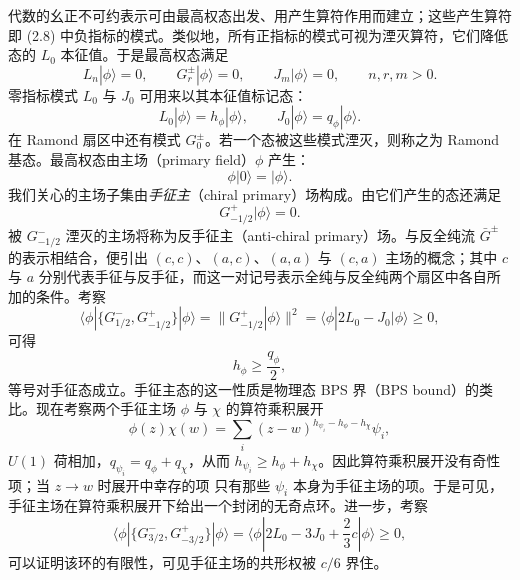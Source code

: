 代数的幺正不可约表示可由最高权态出发、用产生算符作用而建立；这些产生算符即 (2.8) 中负指标的模式。类似地，所有正指标的模式可视为湮灭算符，它们降低态的 $L_{0}$ 本征值。于是最高权态满足
\begin{equation}\tag{2.10}
L_{n}|\phi\rangle=0,\qquad G^{\pm}_{r}|\phi\rangle=0,\qquad J_{m}|\phi\rangle=0,\qquad n,r,m>0.
\end{equation}
零指标模式 $L_{0}$ 与 $J_{0}$ 可用来以其本征值标记态：
\begin{equation}\tag{2.11}
L_{0}|\phi\rangle=h_{\phi}|\phi\rangle,\qquad J_{0}|\phi\rangle=q_{\phi}|\phi\rangle.
\end{equation}
在 Ramond 扇区中还有模式 $G^{\pm}_{0}$。若一个态被这些模式湮灭，则称之为 Ramond 基态。最高权态由主场（primary field）$\phi$ 产生：
\begin{equation}\tag{2.12}
\phi|0\rangle=|\phi\rangle.
\end{equation}
我们关心的主场子集由\emph{手征主}（chiral primary）场构成。由它们产生的态还满足
\begin{equation}\tag{2.13}
G^{+}_{-1/2}|\phi\rangle=0.
\end{equation}
被 $G^{-}_{-1/2}$ 湮灭的主场将称为反手征主（anti-chiral primary）场。与反全纯流 $\bar G^{\pm}$ 的表示相结合，便引出 $(c,c)$、$(a,c)$、$(a,a)$ 与 $(c,a)$ 主场的概念；其中 $c$ 与 $a$ 分别代表手征与反手征，而这一对记号表示全纯与反全纯两个扇区中各自所加的条件。考察
\begin{equation}\tag{2.14}
\langle\phi|\{G^{-}_{1/2},G^{+}_{-1/2}\}|\phi\rangle=\|G^{+}_{-1/2}|\phi\rangle\|^{2}=\langle\phi|2L_{0}-J_{0}|\phi\rangle\ge 0,
\end{equation}
可得
\begin{equation}\tag{2.15}
h_{\phi}\ge\frac{q_{\phi}}{2},
\end{equation}
等号对手征态成立。手征主态的这一性质是物理态 BPS 界（BPS bound）的类比。现在考察两个手征主场 $\phi$ 与 $\chi$ 的算符乘积展开
\begin{equation}\tag{2.16}
\phi(z)\chi(w)=\sum_{i}(z-w)^{h_{\psi_{i}}-h_{\phi}-h_{\chi}}\psi_{i},
\end{equation}
$U(1)$ 荷相加，$q_{\psi_{i}}=q_{\phi}+q_{\chi}$，从而 $h_{\psi_{i}}\ge h_{\phi}+h_{\chi}$。因此算符乘积展开没有奇性项；当 $z\to w$ 时展开中幸存的项
只有那些 $\psi_{i}$ 本身为手征主场的项。于是可见，手征主场在算符乘积展开下给出一个封闭的无奇点环。进一步，考察
\begin{equation}\tag{2.17}
\langle\phi|\{G^{-}_{3/2},G^{+}_{-3/2}\}|\phi\rangle=\langle\phi|2L_{0}-3J_{0}+\frac{2}{3}c|\phi\rangle\ge 0,
\end{equation}
可以证明该环的有限性，可见手征主场的共形权被 $c/6$ 界住。

